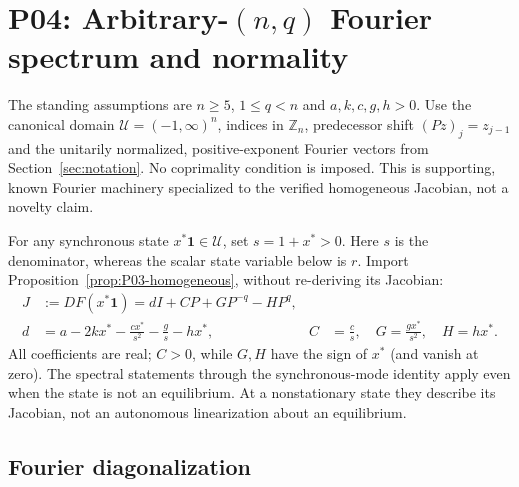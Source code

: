 \documentclass[11pt]{article}
\newcommand{\Zn}{\mathbb{Z}_n}
\newcommand{\one}{\mathbf{1}}
\newcommand{\Domain}{\mathcal{U}}
\theoremstyle{definition}
\theoremstyle{remark}
\begin{document}
\section{P04: Arbitrary-\texorpdfstring{$(n,q)$}{(n,q)} Fourier spectrum and normality}
\label{sec:P04}
The standing assumptions are $n\ge5$, $1\le q<n$ and
$a,k,c,g,h>0$. Use the canonical domain $\Domain=(-1,\infty)^n$,
indices in $\Zn$, predecessor shift $(Pz)_j=z_{j-1}$ and the
unitarily normalized, positive-exponent Fourier vectors from
Section~\ref{sec:notation}. No coprimality condition is imposed.
This is supporting, known Fourier machinery specialized to the
verified homogeneous Jacobian, not a novelty claim.

For any synchronous state $x^*\one\in\Domain$, set $s=1+x^*>0$.
Here $s$ is the denominator, whereas the scalar state variable below
is $r$. Import Proposition~\ref{prop:P03-homogeneous}, without
re-deriving its Jacobian:
\begin{align}
 J&:=DF(x^*\one)=dI+CP+GP^{-q}-HP^q,\label{eq:P04-input}\\
 d&=a-2kx^*-\frac{cx^*}{s^2}-\frac{g}{s}-hx^*,
 &C&=\frac{c}{s},\quad G=\frac{gx^*}{s^2},\quad H=hx^*.
 \label{eq:P04-coefficients}
\end{align}
All coefficients are real; $C>0$, while $G,H$ have the sign of
$x^*$ (and vanish at zero). The spectral statements through the
synchronous-mode identity apply even when the state is not an
equilibrium. At a nonstationary state they describe its Jacobian,
not an autonomous linearization about an equilibrium.

\subsection{Fourier diagonalization}
\label{slot:P04-1}
\end{document}
